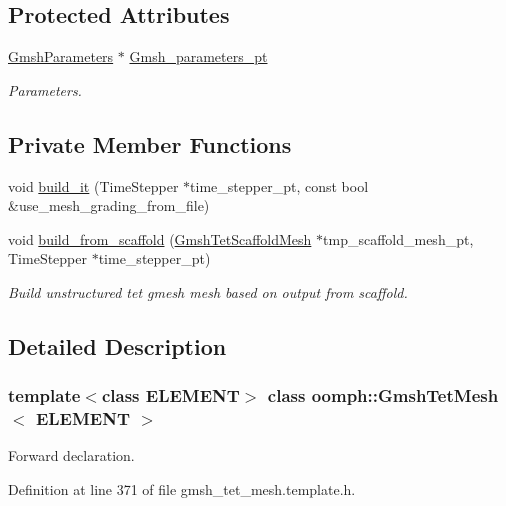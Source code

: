 \subsection*{Protected Attributes}
\begin{DoxyCompactItemize}
\item 
\hyperlink{classoomph_1_1GmshParameters}{Gmsh\+Parameters} $\ast$ \hyperlink{classoomph_1_1GmshTetMesh_a6d9878df9dfca45b4883909ed1e78536}{Gmsh\+\_\+parameters\+\_\+pt}
\begin{DoxyCompactList}\small\item\em Parameters. \end{DoxyCompactList}\end{DoxyCompactItemize}
\subsection*{Private Member Functions}
\begin{DoxyCompactItemize}
\item 
void \hyperlink{classoomph_1_1GmshTetMesh_aaec22ccd211f81dd440e9618d6667718}{build\+\_\+it} (Time\+Stepper $\ast$time\+\_\+stepper\+\_\+pt, const bool \&use\+\_\+mesh\+\_\+grading\+\_\+from\+\_\+file)
\item 
void \hyperlink{classoomph_1_1GmshTetMesh_a80132087ae6dd00c7631823a8453e078}{build\+\_\+from\+\_\+scaffold} (\hyperlink{classoomph_1_1GmshTetScaffoldMesh}{Gmsh\+Tet\+Scaffold\+Mesh} $\ast$tmp\+\_\+scaffold\+\_\+mesh\+\_\+pt, Time\+Stepper $\ast$time\+\_\+stepper\+\_\+pt)
\begin{DoxyCompactList}\small\item\em Build unstructured tet gmesh mesh based on output from scaffold. \end{DoxyCompactList}\end{DoxyCompactItemize}


\subsection{Detailed Description}
\subsubsection*{template$<$class E\+L\+E\+M\+E\+NT$>$\newline
class oomph\+::\+Gmsh\+Tet\+Mesh$<$ E\+L\+E\+M\+E\+N\+T $>$}

Forward declaration. 

Definition at line 371 of file gmsh\+\_\+tet\+\_\+mesh.\+template.\+h.



